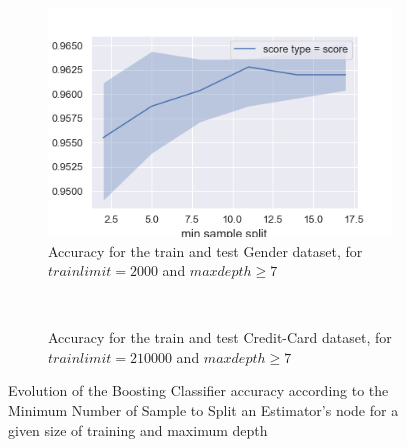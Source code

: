 \documentclass[10pt]{article}
\begin{document}
		\paragraph*{}
			\begin{figure}[h]
				\centering
				\begin{subfigure}[]{0.45\columnwidth}
					\centering
					\includegraphics[width=\linewidth]{../graphics/boost_gender_min_sample_split_score_type_score_type.png}
					\caption{Accuracy for the train and test Gender dataset, for $trainlimit=2000$ and $maxdepth\geq7$}
					\label{boost_sc_train_vs_test_ms}
				\end{subfigure}
				~
				\begin{subfigure}[]{0.45\columnwidth}
					\centering
					\caption{Accuracy for the train and test Credit-Card dataset, for $trainlimit=210000$ and $maxdepth\geq7$}
					\label{boost_cc_train_vs_test_ms}
				\end{subfigure}
				\caption{Evolution of the Boosting Classifier accuracy according to the Minimum Number of Sample to Split an Estimator's node for a given size of training and maximum depth}
				\label{boost_train_vs_test_ms}
			\end{figure}
\end{document}
